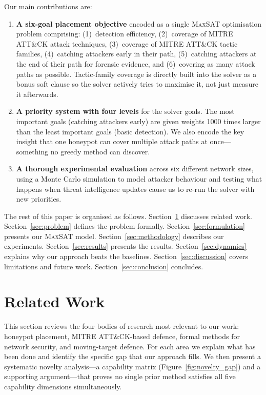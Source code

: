\documentclass[journal]{IEEEtran}
\newcommand{\maxsat}{\textsc{MaxSAT}}
\begin{document}
Our main contributions are:
\begin{enumerate}
\item \textbf{A six-goal placement objective} encoded as a
single \maxsat{} optimisation problem comprising:
(1)~detection efficiency,
(2)~coverage of MITRE ATT\&CK attack techniques,
(3)~coverage of MITRE ATT\&CK tactic families,
(4)~catching attackers early in their path,
(5)~catching attackers at the end of their path for forensic
evidence, and
(6)~covering as many attack paths as possible.
Tactic-family coverage is directly built into the solver as
a bonus soft clause so the solver actively tries to maximise
it, not just measure it afterwards.

\item \textbf{A priority system with four levels} for the
solver goals.
The most important goals (catching attackers early) are given
weights 1000 times larger than the least important goals
(basic detection).
We also encode the key insight that one honeypot can cover
multiple attack paths at once---something no greedy method
can discover.

\item \textbf{A thorough experimental evaluation} across six
different network sizes, using a Monte Carlo simulation to
model attacker behaviour and testing what happens when threat
intelligence updates cause us to re-run the solver with new
priorities.
\end{enumerate}

The rest of this paper is organised as follows.
Section~\ref{sec:related} discusses related work.
Section~\ref{sec:problem} defines the problem formally.
Section~\ref{sec:formulation} presents our \maxsat{} model.
Section~\ref{sec:methodology} describes our experiments.
Section~\ref{sec:results} presents the results.
Section~\ref{sec:dynamics} explains why our approach beats
the baselines.
Section~\ref{sec:discussion} covers limitations and future
work.
Section~\ref{sec:conclusion} concludes.

\section{Related Work}
\label{sec:related}

This section reviews the four bodies of research most
relevant to our work: honeypot placement, MITRE ATT\&CK-based
defence, formal methods for network security, and
moving-target defence.
For each area we explain what has been done and identify the
specific gap that our approach fills.
We then present a systematic novelty analysis---a capability
matrix (Figure~\ref{fig:novelty_gap}) and a supporting
argument---that proves no single prior method satisfies all
five capability dimensions simultaneously.
\end{document}
